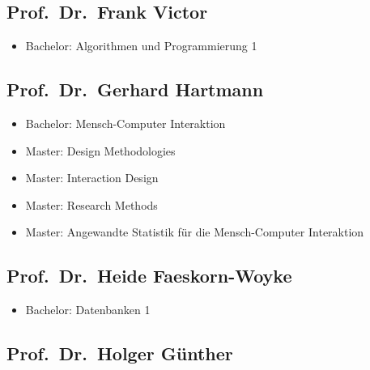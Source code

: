 \subsection{Prof.~Dr.~Frank
Victor\label{/mi-2017/selbstbericht/0800-ausstattung/0000-ausstattung}}\label{prof.dr.frank-victorpathlabelmi-2017selbstbericht0800-ausstattung0000-ausstattung}

\begin{itemize}
\tightlist
\item
  Bachelor: Algorithmen und Programmierung 1
\end{itemize}

\subsection{Prof.~Dr.~Gerhard
Hartmann\label{/mi-2017/selbstbericht/0800-ausstattung/0000-ausstattung}}\label{prof.dr.gerhard-hartmannpathlabelmi-2017selbstbericht0800-ausstattung0000-ausstattung}

\begin{itemize}
\tightlist
\item
  Bachelor: Mensch-Computer Interaktion
\item
  Master: Design Methodologies
\item
  Master: Interaction Design
\item
  Master: Research Methods
\item
  Master: Angewandte Statistik für die Mensch-Computer Interaktion
\end{itemize}

\subsection{Prof.~Dr.~Heide
Faeskorn-Woyke\label{/mi-2017/selbstbericht/0800-ausstattung/0000-ausstattung}}\label{prof.dr.heide-faeskorn-woykepathlabelmi-2017selbstbericht0800-ausstattung0000-ausstattung}

\begin{itemize}
\tightlist
\item
  Bachelor: Datenbanken 1
\end{itemize}

\subsection{Prof.~Dr.~Holger
Günther\label{/mi-2017/selbstbericht/0800-ausstattung/0000-ausstattung}}\label{prof.dr.holger-guxfcntherpathlabelmi-2017selbstbericht0800-ausstattung0000-ausstattung}

